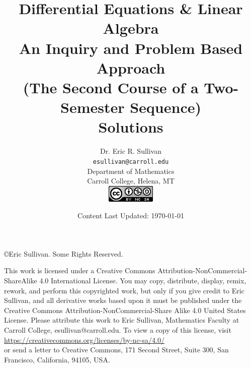 \documentclass[12pt,oneside]{book}
\title{Differential Equations \& Linear Algebra \\ An Inquiry and Problem Based Approach
    \\ {\small (The Second Course of a Two-Semester Sequence)}
    \ifnum\ShowSoln=1 {\color{red} \\ {\bf Solutions}} \fi}
\date{Content Last Updated: \today}
\author{Dr. Eric R. Sullivan \\ \texttt{esullivan@carroll.edu}\\ Department of
Mathematics \\
Carroll College, Helena, MT \\
\includegraphics{CreativeCommons.png} \\\vspace{3in}
}
\theoremstyle{definition}
\begin{document}
\maketitle
\newpage
\noindent \copyright Eric Sullivan. Some Rights Reserved.

\vspace{0.2in}
This work is licensed under a Creative Commons Attribution-NonCommercial-ShareAlike 4.0
International License.
You may copy, distribute, display, remix, rework, and perform this copyrighted work, but only if
you give credit to Eric Sullivan, and all derivative works based upon it must be published
under the Creative Commons Attribution-NonCommercial-Share Alike 4.0 United States License. Please
attribute this work to Eric Sullivan, Mathematics Faculty at Carroll College,
esullivan@carroll.edu. To view a copy of this license, visit\\
\href{https://creativecommons.org/licenses/by-nc-sa/4.0/}{https://creativecommons.org/licenses/by-nc-sa/4.0/}\\
or send a letter to Creative Commons, 171 Second Street, Suite 300, San Francisco,
California, 94105, USA.
\tableofcontents













% 



\begin{appendices}
    
    
    
    
    
\end{appendices}
\end{document}
